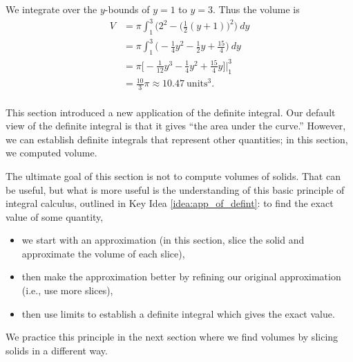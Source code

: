 {We integrate over the $y$-bounds of $y=1$ to $y=3$. Thus the volume is
\begin{align*}
V 	&=	\pi\int_1^3\Big(2^2 - \big(\frac12(y+1)\big)^2\Big)\ dy \\
		&=	\pi\int_1^3\Big(-\frac14y^2-\frac12y+\frac{15}4\Big)\ dy \\
		&= 	\pi\Big[-\frac1{12}y^3-\frac14y^2+\frac{15}4y\Big]\Big|_1^3\\
		&= \frac{10}3\pi \approx 10.47\ \text{units}^3.
\end{align*}
\baselineskip
}\\

This section introduced a new application of the definite integral. Our default view of the definite integral is that it gives ``the area under the curve.'' However, we can establish definite integrals that represent other quantities; in this section, we computed volume.

The ultimate goal of this section is not to compute volumes of solids. That can be useful, but what is more useful is the understanding of this basic principle of integral calculus, outlined in Key Idea \ref{idea:app_of_defint}: to find the exact value of some quantity, 
\begin{itemize}
	\item we start with an approximation (in this section, slice the solid and approximate the volume of each slice), 
	\item then make the approximation better by refining our original approximation (i.e., use more slices), 
	\item	then use limits to establish a definite integral which gives the exact value.
\end{itemize}

We practice this principle in the next section where we find volumes by slicing solids in a different way.

